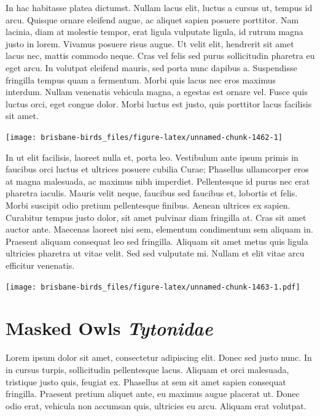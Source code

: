 \documentclass[]{book}
\let\origfigure\figure
\let\endorigfigure\endfigure
\renewenvironment{figure}[1][2] {
  \expandafter\origfigure\expandafter[H]
} {
  \endorigfigure
}
\begin{document}
In hac habitasse platea dictumst. Nullam lacus elit, luctus a cursus ut,
tempus id arcu. Quisque ornare eleifend augue, ac aliquet sapien posuere
porttitor. Nam lacinia, diam at molestie tempor, erat ligula vulputate
ligula, id rutrum magna justo in lorem. Vivamus posuere risus augue. Ut
velit elit, hendrerit sit amet lacus nec, mattis commodo neque. Cras vel
felis sed purus sollicitudin pharetra eu eget arcu. In volutpat eleifend
mauris, sed porta nunc dapibus a. Suspendisse fringilla tempus quam a
fermentum. Morbi quis lacus nec eros maximus interdum. Nullam venenatis
vehicula magna, a egestas est ornare vel. Fusce quis luctus orci, eget
congue dolor. Morbi luctus est justo, quis porttitor lacus facilisis sit
amet.

\begin{figure}
\texttt{[image: brisbane-birds\_files/figure-latex/unnamed-chunk-1462-1]} \caption{insert figure caption}\label{fig:unnamed-chunk-1462}
\end{figure}

In ut elit facilisis, laoreet nulla et, porta leo. Vestibulum ante ipsum
primis in faucibus orci luctus et ultrices posuere cubilia Curae;
Phasellus ullamcorper eros at magna malesuada, ac maximus nibh
imperdiet. Pellentesque id purus nec erat pharetra iaculis. Mauris velit
neque, faucibus sed faucibus et, lobortis et felis. Morbi suscipit odio
pretium pellentesque finibus. Aenean ultrices ex sapien. Curabitur
tempus justo dolor, sit amet pulvinar diam fringilla at. Cras sit amet
auctor ante. Maecenas laoreet nisi sem, elementum condimentum sem
aliquam in. Praesent aliquam consequat leo sed fringilla. Aliquam sit
amet metus quis ligula ultricies pharetra ut vitae velit. Sed sed
vulputate mi. Nullam et elit vitae arcu efficitur venenatis.

\begin{figure}
\centering
\texttt{[image: brisbane-birds\_files/figure-latex/unnamed-chunk-1463-1.pdf]}
\caption{\label{fig:unnamed-chunk-1463}insert figure caption}
\end{figure}

\chapter{\texorpdfstring{Masked Owls
\emph{Tytonidae}}{Masked Owls Tytonidae}}\label{masked-owls-tytonidae}

Lorem ipsum dolor sit amet, consectetur adipiscing elit. Donec sed justo
nunc. In in cursus turpis, sollicitudin pellentesque lacus. Aliquam et
orci malesuada, tristique justo quis, feugiat ex. Phasellus at sem sit
amet sapien consequat fringilla. Praesent pretium aliquet ante, eu
maximus augue placerat ut. Donec odio erat, vehicula non accumsan quis,
ultricies eu arcu. Aliquam erat volutpat.
\end{document}
